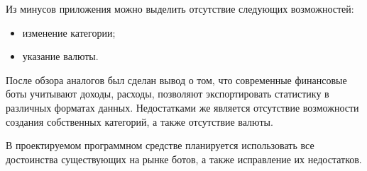 Из минусов приложения можно выделить отсутствие следующих возможностей:

\begin{itemize}
	\item изменение категории;
	\item указание валюты.
\end{itemize}

После обзора аналогов был сделан вывод о том, что современные финансовые боты учитывают доходы, расходы, позволяют экспортировать статистику в различных форматах данных. Недостатками же является отсутствие возможности создания собственных категорий, а также отсутствие валюты.

В проектируемом программном средстве планируется использовать все достоинства существующих на рынке ботов, а также исправление их недостатков.


